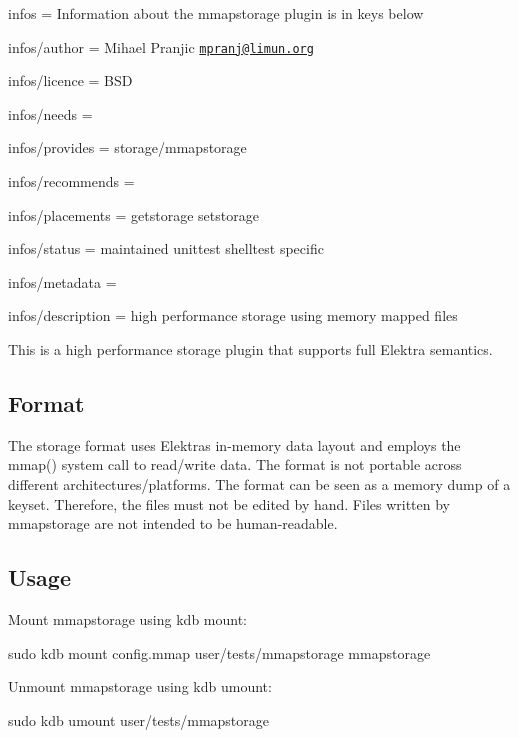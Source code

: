 
\begin{DoxyItemize}
\item infos = Information about the mmapstorage plugin is in keys below
\item infos/author = Mihael Pranjic \href{mailto:mpranj@limun.org}{\tt mpranj@limun.\+org}
\item infos/licence = B\+SD
\item infos/needs =
\item infos/provides = storage/mmapstorage
\item infos/recommends =
\item infos/placements = getstorage setstorage
\item infos/status = maintained unittest shelltest specific
\item infos/metadata =
\item infos/description = high performance storage using memory mapped files
\end{DoxyItemize}

This is a high performance storage plugin that supports full Elektra semantics.

\subsection*{Format}

The storage format uses Elektra\textquotesingle{}s in-\/memory data layout and employs the {\ttfamily mmap()} system call to read/write data. The format is not portable across different architectures/platforms. The format can be seen as a memory dump of a keyset. Therefore, the files must not be edited by hand. Files written by mmapstorage are not intended to be human-\/readable.

\subsection*{Usage}

Mount mmapstorage using {\ttfamily kdb mount}\+:


\begin{DoxyCode}
sudo kdb mount config.mmap user/tests/mmapstorage mmapstorage
\end{DoxyCode}


Unmount mmapstorage using {\ttfamily kdb umount}\+:


\begin{DoxyCode}
sudo kdb umount user/tests/mmapstorage
\end{DoxyCode}


